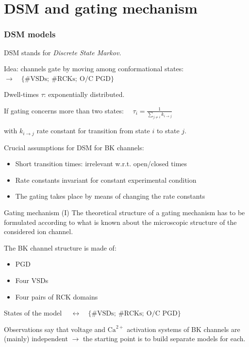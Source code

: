 \documentclass{beamer}
\newcommand{\ca}{\text{Ca}^{2+}}
\begin{document}
\section{DSM and gating mechanism}
\begin{frame}[t]\frametitle{DSM models}
    DSM stands for \emph{Discrete State Markov.}

    Idea: channels gate by moving among conformational states: $\rightarrow \quad\{\# \text{VSDs};\ \# \text{RCKs};\ \text{O/C PGD}\}$

    Dwell-times $\tau$: exponentially distributed.

    If gating concerns more than two states: $\quad \tau_i = \frac{1}{\sum_{j\neq i} k_{i\rightarrow j}}$
  
    with $k_{i\rightarrow j}$ rate constant for transition from state $i$ to state $j.$


    Crucial assumptions for DSM for BK channels:
	\begin{itemize}
    	\item Short transition times: irrelevant w.r.t. open/closed times
    	\item Rate constants invariant for constant experimental condition
    	\item The gating takes place by means of changing the rate constants
    \end{itemize}



\end{frame}

\begin{frame}{Gating mechanism (I)}
The theoretical structure of a gating mechanism has to be formulated according to what is known about the microscopic structure of the considered ion channel.

The BK channel structure is made of:
\begin{itemize}
	\item PGD
	\item Four VSDs
	\item Four pairs of RCK domains
\end{itemize}

States of the model $ \quad \leftrightarrow \quad\{\# \text{VSDs};\ \# \text{RCKs};\ \text{O/C PGD}\}$
 
Observations say that voltage and $\ca$ activation systems of BK channels are (mainly) independent $\rightarrow$ the starting point is to build separate models for each.
\end{frame}
\end{document}
